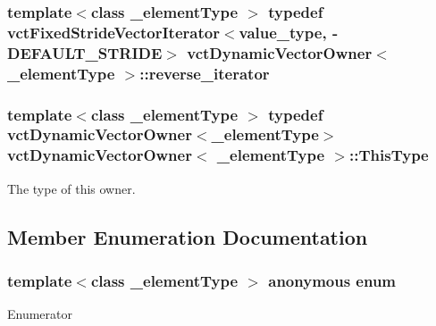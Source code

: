 \hypertarget{classvct_dynamic_vector_owner_a963d655b94fe07a9c7abbee2705005d1}{
\subsubsection[{reverse\-\_\-iterator}]{\setlength{\rightskip}{0pt plus 5cm}template$<$class \-\_\-element\-Type $>$ typedef {\bf vct\-Fixed\-Stride\-Vector\-Iterator}$<$value\-\_\-type, -\/{\bf D\-E\-F\-A\-U\-L\-T\-\_\-\-S\-T\-R\-I\-D\-E}$>$ {\bf vct\-Dynamic\-Vector\-Owner}$<$ \-\_\-element\-Type $>$\-::{\bf reverse\-\_\-iterator}}}\label{classvct_dynamic_vector_owner_a963d655b94fe07a9c7abbee2705005d1}
\hypertarget{classvct_dynamic_vector_owner_ad27e45098d2fe34a4650fca580526b18}{
\subsubsection[{This\-Type}]{\setlength{\rightskip}{0pt plus 5cm}template$<$class \-\_\-element\-Type $>$ typedef {\bf vct\-Dynamic\-Vector\-Owner}$<$\-\_\-element\-Type$>$ {\bf vct\-Dynamic\-Vector\-Owner}$<$ \-\_\-element\-Type $>$\-::{\bf This\-Type}}}\label{classvct_dynamic_vector_owner_ad27e45098d2fe34a4650fca580526b18}
The type of this owner. 

\subsection{Member Enumeration Documentation}
\hypertarget{classvct_dynamic_vector_owner_aa8a4c610d62931e2fa3374a05e4ae56c}{\subsubsection[{anonymous enum}]{\setlength{\rightskip}{0pt plus 5cm}template$<$class \-\_\-element\-Type $>$ anonymous enum}}\label{classvct_dynamic_vector_owner_aa8a4c610d62931e2fa3374a05e4ae56c}
\begin{Desc}
\item[Enumerator]\par
\begin{description}
\item[{\em 
\hypertarget{classvct_dynamic_vector_owner_aa8a4c610d62931e2fa3374a05e4ae56ca4925b2613604288a5936bd34e22b6a9f}{D\-E\-F\-A\-U\-L\-T\-\_\-\-S\-T\-R\-I\-D\-E}\label{classvct_dynamic_vector_owner_aa8a4c610d62931e2fa3374a05e4ae56ca4925b2613604288a5936bd34e22b6a9f}
}]\end{description}
\end{Desc}


